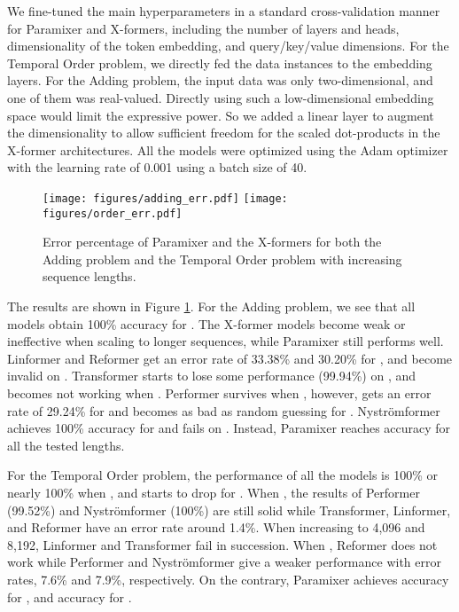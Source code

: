 \documentclass{article}
\begin{document}
We fine-tuned the main hyperparameters in a standard cross-validation manner for Paramixer and X-formers, including the number of layers and heads, dimensionality of the token embedding, and query/key/value dimensions. For the Temporal Order problem, we directly fed the data instances to the embedding layers. For the Adding problem, the input data was only two-dimensional, and one of them was real-valued. Directly using such a low-dimensional embedding space would limit the expressive power. So we added a linear layer to augment the dimensionality to allow sufficient freedom for the scaled dot-products in the X-former architectures. All the models were optimized using the Adam optimizer \cite{adam} with the learning rate of 0.001 using a batch size of 40.

\setlength\tabcolsep{1.5pt}
\newcommand{\sqimgwidth}{7.5cm}
\begin{figure}[t]
    \centering
    \texttt{[image: figures/adding\_err.pdf]}
	\texttt{[image: figures/order\_err.pdf]}\\
    \caption{Error percentage of Paramixer and the X-formers for both the Adding problem and the Temporal Order problem with increasing sequence lengths.}
    \label{fig:acc_synth}
\end{figure}

The results are shown in Figure \ref{fig:acc_synth}. For the Adding problem, we see that all models obtain 100\% accuracy for . The X-former models become weak or ineffective when scaling to longer sequences, while Paramixer still performs well. Linformer and Reformer get an error rate of 33.38\% and 30.20\% for , and become invalid on . Transformer starts to lose some performance (99.94\%) on , and becomes not working when . Performer survives when , however, gets an error rate of 29.24\% for  and becomes as bad as random guessing for . Nystr\"omformer achieves 100\% accuracy for  and fails on . Instead, Paramixer reaches  accuracy for all the tested lengths.

For the Temporal Order problem, the performance of all the models is 100\% or nearly 100\% when , and starts to drop for . When , the results of Performer (99.52\%) and Nystr\"omformer (100\%) are still solid while Transformer, Linformer, and Reformer have an error rate around 1.4\%. When increasing  to 4,096 and 8,192, Linformer and Transformer fail in succession. When , Reformer does not work while Performer and Nystr\"omformer give a weaker performance with error rates, 7.6\% and 7.9\%, respectively. On the contrary, Paramixer achieves  accuracy for , and  accuracy for .
\end{document}

